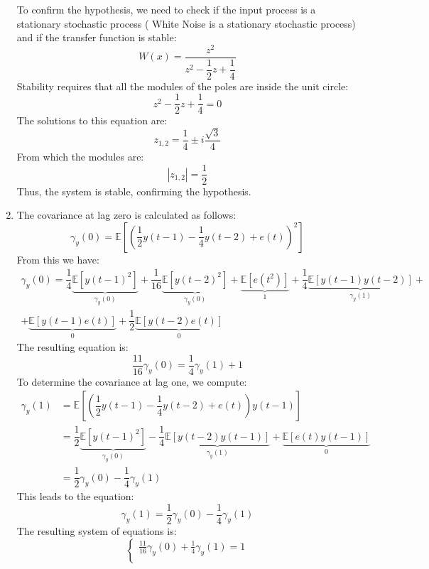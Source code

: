 \begin{enumerate}
        To confirm the hypothesis, we need to check if the input process is a stationary stochastic process ( White Noise is a stationary stochastic process) and if the transfer function is stable:
        \[W(x)=\dfrac{z^2}{z^2-\dfrac{1}{2}z+\dfrac{1}{4}}\]
        Stability requires that all the modules of the poles are inside the unit circle:
        \[z^2-\dfrac{1}{2}z+\dfrac{1}{4}=0\]
        The solutions to this equation are:
        \[z_{1,2}=\dfrac{1}{4}\pm i \dfrac{\sqrt{3}}{4}\] 
        From which the modules are:
        \[\left\lvert z_{1,2} \right\rvert =\dfrac{1}{2}\]
        Thus, the system is stable, confirming the hypothesis.
    \item The covariance at lag zero is calculated as follows:
        \[\gamma_y(0) = \mathbb{E}\left[\left(\dfrac{1}{2}y(t-1)-\dfrac{1}{4}y(t-2)+e(t)\right)^2\right]\]
        From this we have: 
        \begin{multline*}
            \gamma_y(0) = \dfrac{1}{4}\underbrace{\mathbb{E}\left[{y(t-1)}^2\right]}_{\gamma_y(0)} +\dfrac{1}{16}\underbrace{\mathbb{E}\left[{y(t-2)}^2\right]}_{\gamma_y(0)} +\underbrace{\mathbb{E}\left[e(t^2)\right]}_1 +\dfrac{1}{4}\underbrace{\mathbb{E}\left[y(t-1)y(t-2)\right]}_{\gamma_y(1)} + \\
            +\underbrace{\mathbb{E}\left[y(t-1)e(t)\right]}_0 + \dfrac{1}{2}\underbrace{\mathbb{E}\left[y(t-2)e(t)\right]}_0 
        \end{multline*}
        The resulting equation is:
        \[\dfrac{11}{16}\gamma_y(0)=\dfrac{1}{4}\gamma_y(1)+1\]
        To determine the covariance at lag one, we compute:
        \begin{align*}
            \gamma_y(1)     &= \mathbb{E}\left[\left(\dfrac{1}{2}y(t-1)-\dfrac{1}{4}y(t-2)+e(t)\right)y(t-1)\right] \\
                            &= \dfrac{1}{2}\underbrace{\mathbb{E}\left[{y(t-1)}^2\right]}_{\gamma_y(0)} -\dfrac{1}{4}\underbrace{\mathbb{E}\left[y(t-2)y(t-1)\right]}_{\gamma_y(1)} +\underbrace{\mathbb{E}\left[e(t)y(t-1)\right]}_0  \\
                            &= \dfrac{1}{2}\gamma_y(0) -\dfrac{1}{4}\gamma_y(1) 
        \end{align*}
        This leads to the equation:
        \[ \gamma_y(1)=\dfrac{1}{2}\gamma_y(0) -\dfrac{1}{4}\gamma_y(1)\]
        The resulting system of equations is:
        \[\begin{cases}
            \frac{11}{16}\gamma_y(0)+\frac{1}{4}\gamma_y(1)=1 \\ 

\end{cases}\]
\end{enumerate}
